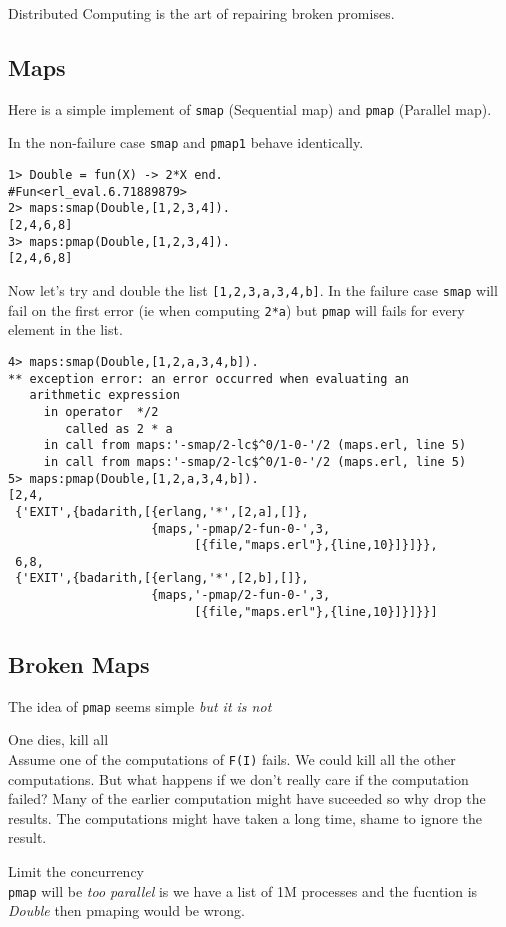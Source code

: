 \documentclass[10pt]{article}
\begin{document}
Distributed Computing is the art of repairing broken promises.

\subsection{Maps}

Here is a simple implement of \verb+smap+ (Sequential map) and
\verb+pmap+ (Parallel map).


In the non-failure case \verb+smap+ and \verb+pmap1+ behave
identically.

\begin{Verbatim}
1> Double = fun(X) -> 2*X end.
#Fun<erl_eval.6.71889879>
2> maps:smap(Double,[1,2,3,4]).
[2,4,6,8]
3> maps:pmap(Double,[1,2,3,4]). 
[2,4,6,8]
\end{Verbatim}

Now let's try and double the list \verb+[1,2,3,a,3,4,b]+. In the
failure case \verb+smap+ will fail on the first error (ie when
computing \verb+2*a+) but \verb+pmap+ will fails for every element in
the list.

\begin{Verbatim}
4> maps:smap(Double,[1,2,a,3,4,b]).
** exception error: an error occurred when evaluating an 
   arithmetic expression
     in operator  */2
        called as 2 * a
     in call from maps:'-smap/2-lc$^0/1-0-'/2 (maps.erl, line 5)
     in call from maps:'-smap/2-lc$^0/1-0-'/2 (maps.erl, line 5)
5> maps:pmap(Double,[1,2,a,3,4,b]).
[2,4,
 {'EXIT',{badarith,[{erlang,'*',[2,a],[]},
                    {maps,'-pmap/2-fun-0-',3,
                          [{file,"maps.erl"},{line,10}]}]}},
 6,8,
 {'EXIT',{badarith,[{erlang,'*',[2,b],[]},
                    {maps,'-pmap/2-fun-0-',3,
                          [{file,"maps.erl"},{line,10}]}]}}]

\end{Verbatim}

\subsection{Broken Maps}

The idea of \verb+pmap+ seems simple {\sl but it is not}

\begin{description}
\item One dies, kill all\\ 
Assume one of the computations of
\verb+F(I)+ fails. We could kill all the other computations. But
what happens if we don't really care if the computation failed? Many
of the earlier computation might have suceeded so why drop the
results. The computations might have taken a long time, shame to
ignore the result.

\item Limit the concurrency\\
\verb+pmap+ will be {\sl too parallel} is we have a list of 1M processes
and the fucntion is {\sl Double} then pmaping would be wrong.
\end{description}
\end{document}
